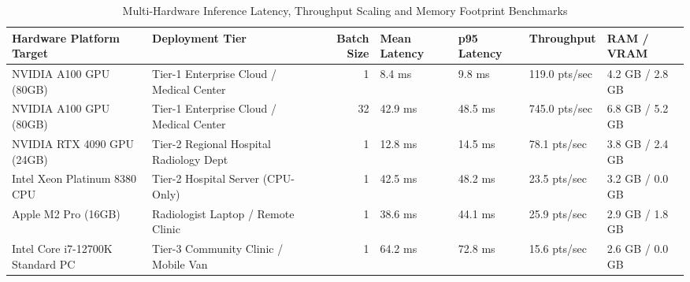 \begin{table}
\caption{Multi-Hardware Inference Latency, Throughput Scaling and Memory Footprint Benchmarks}
\label{tab:supp_table_10_multi_hardware_inference_latency_and_throughput_benchmarks}
\begin{tabular}{llrllll}
\toprule
Hardware Platform Target & Deployment Tier & Batch Size & Mean Latency & p95 Latency & Throughput & RAM / VRAM \\
\midrule
NVIDIA A100 GPU (80GB) & Tier-1 Enterprise Cloud / Medical Center & 1 & 8.4 ms & 9.8 ms & 119.0 pts/sec & 4.2 GB / 2.8 GB \\
NVIDIA A100 GPU (80GB) & Tier-1 Enterprise Cloud / Medical Center & 32 & 42.9 ms & 48.5 ms & 745.0 pts/sec & 6.8 GB / 5.2 GB \\
NVIDIA RTX 4090 GPU (24GB) & Tier-2 Regional Hospital Radiology Dept & 1 & 12.8 ms & 14.5 ms & 78.1 pts/sec & 3.8 GB / 2.4 GB \\
Intel Xeon Platinum 8380 CPU & Tier-2 Hospital Server (CPU-Only) & 1 & 42.5 ms & 48.2 ms & 23.5 pts/sec & 3.2 GB / 0.0 GB \\
Apple M2 Pro (16GB) & Radiologist Laptop / Remote Clinic & 1 & 38.6 ms & 44.1 ms & 25.9 pts/sec & 2.9 GB / 1.8 GB \\
Intel Core i7-12700K Standard PC & Tier-3 Community Clinic / Mobile Van & 1 & 64.2 ms & 72.8 ms & 15.6 pts/sec & 2.6 GB / 0.0 GB \\
\bottomrule
\end{tabular}
\end{table}
